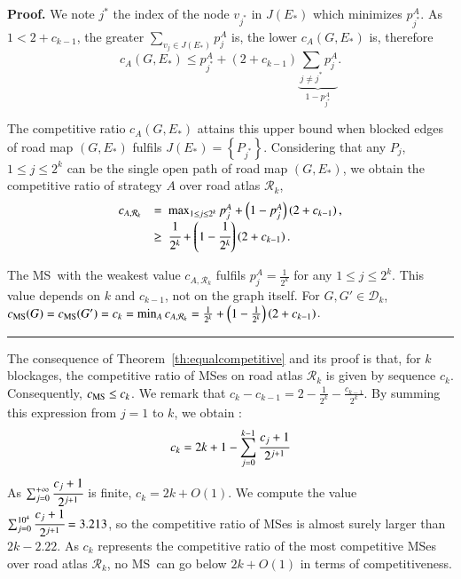 \documentclass[preprint]{elsarticle}
\newenvironment{proof}[1][Proof]{\textbf{#1.} }{\ \rule{0.5em}{0.5em}}
\newcommand{\set}[1]{\left\{ #1 \right\}}
\newcommand{\mcalr}{\mathcal{R}}
\newcommand{\mcald}{\mathcal{D}}
\newcommand{\mts}{MS}
\newcommand{\cms}{c_{\mbox{\scriptsize{MS}}}}
\begin{document}
\begin{proof}
We note $j^*$ the index of the node $v_{j^*}$ in $J\left(E_*\right)$ which minimizes $p_{j^*}^A$. As $1 < 2 + c_{k-1}$, the greater $\sum_{v_j\in J(E_*)} p_j^A$ is, the lower $c_A(G, E_*)$ is, therefore
\[
c_A(G, E_*) \le p_{j^*}^A + (2+c_{k-1})\underbrace{\sum_{j\neq j^*}p_j^A }_{1-p_{j^*}^A}.
\] 

The competitive ratio $c_A(G, E_*)$ attains this upper bound when blocked edges of road map $\left(G,E_*\right)$ fulfils $J\left(E_*\right) = \set{P_{j^*}}$. Considering that any $P_j$, $1 \le j \le 2^k$ can be the single open path of road map $\left(G,E_*\right)$, we obtain the competitive ratio of strategy $A$ over road atlas $\mcalr_k$,
\[
\begin{array}{rl}
c_{A,\mcalr_k} & =  ~\max_{1 \le j \le 2^k} p_j^{A} + \left(1-p_j^{A}\right)\left(2+c_{k-1}\right),\\
& \geq ~\cfrac{1}{2^k} + \left(1-\cfrac{1}{2^k}\right)\left(2+c_{k-1}\right).
\end{array}
\]

The \mts ~with the weakest value $c_{A,\mcalr_k}$ fulfils $p_j^A = \frac{1}{2^k}$ for any $1 \le j \le 2^k$. This value depends on $k$ and $c_{k-1}$, not on the graph itself. For $G,G' \in \mcald_k$, $\cms(G) = \cms(G') = c_k = \min_{A} c_{A,\mcalr_k} = \frac{1}{2^k} + \left(1-\frac{1}{2^k}\right)\left(2+c_{k-1}\right)$.
\end{proof}

The consequence of Theorem~\ref{th:equalcompetitive} and its proof is that, for $k$ blockages, the competitive ratio of \mts es on road atlas $\mcalr_k$ is given by sequence $c_k$. Consequently, $\cms \le c_k$.
We remark that $c_k - c_{k-1} = 2 - \frac{1}{2^{k}} - \frac{c_{k-1}}{2^{k}}$.
By summing this expression from $j = 1$ to $k$, we obtain :
\[
c_k = 2k+1-\sum_{j=0}^{k-1}\cfrac{c_j+1}{2^{j+1}}
\]
As $\sum_{j=0}^{+\infty}\cfrac{c_j+1}{2^{j+1}}$ is finite, $c_k = 2k + O(1)$. We compute the value $\sum_{j=0}^{10^4}\cfrac{c_j+1}{2^{j+1}} = 3.213$, so the competitive ratio of \mts es is almost surely larger than $2k-2.22$. As $c_k$ represents the competitive ratio of the most competitive \mts es over road atlas $\mcalr_k$, no \mts ~can go below $2k+O\left(1\right)$ in terms of competitiveness.
\end{document}
